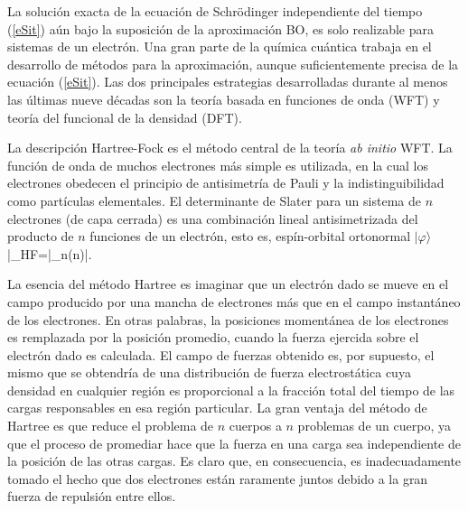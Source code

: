 La soluci\'on exacta de la ecuaci\'on de Schr\"odinger independiente
del tiempo (\ref{eSit}) a\'un bajo la suposici\'on de la 
aproximaci\'on BO, es solo realizable para sistemas de un electr\'on. 
Una gran parte de la qu\'imica cu\'antica trabaja en el desarrollo de
m\'etodos para la aproximaci\'on, aunque suficientemente precisa de 
la ecuaci\'on (\ref{eSit}). Las dos principales estrategias 
desarrolladas durante al menos las \'ultimas nueve d\'ecadas son la 
teor\'ia basada en funciones de onda (WFT) y teor\'ia del funcional 
de la densidad (DFT). 

La descripci\'on Hartree-Fock es el m\'etodo central de la teor\'ia
{\it ab initio} WFT. La funci\'on de onda de muchos electrones m\'as
simple es utilizada, en la cual los electrones obedecen el principio 
de antisimetr\'ia de Pauli y la indistinguibilidad como part\'iculas
elementales. El determinante de Slater para un sistema de $n$ 
electrones (de capa cerrada) es una combinaci\'on lineal 
antisimetrizada del producto de $n$ funciones de un electr\'on, esto
es, esp\'in-orbital ortonormal $|\varphi\rangle$
\be\label{fHF}
|\Phi_{HF}\rangle=\cdots|\varphi_n(n)\rangle|.
\ee

La esencia del m\'etodo Hartree es imaginar que un electr\'on dado se 
mueve en el campo producido por una mancha de electrones m\'as que en
el campo instant\'aneo de los electrones. En otras palabras, la 
posiciones moment\'anea de los electrones es remplazada por la 
posici\'on promedio, cuando la fuerza ejercida sobre el electr\'on 
dado es calculada. El campo de fuerzas obtenido es, por supuesto, el 
mismo que se obtendr\'ia de una distribuci\'on de fuerza 
electrost\'atica cuya densidad en cualquier regi\'on es proporcional 
a la fracci\'on total del tiempo de las cargas responsables en esa 
regi\'on particular. La gran ventaja del m\'etodo de Hartree es que 
reduce el problema de $n$ cuerpos a $n$ problemas de un cuerpo, ya 
que el proceso de promediar hace que la fuerza en una carga sea
independiente de la posici\'on de las otras cargas. Es claro que, en 
consecuencia, es inadecuadamente tomado el hecho que dos electrones
est\'an raramente juntos debido a la gran fuerza de repulsi\'on entre
ellos. 

